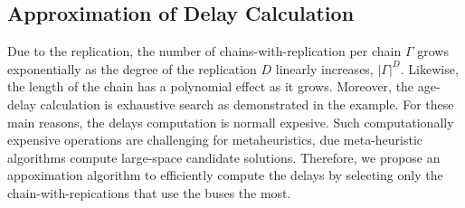 \subsection{Approximation of Delay Calculation}
Due to the replication, the number of chains-with-replication per chain $\Gamma$ grows exponentially as the degree of the replication $D$ linearly increases, $|\Gamma|^D$. Likewise, the length of the chain has a polynomial effect as it grows. Moreover, the age-delay calculation is exhaustive search as demonstrated in the example. For these main reasons, the delays computation is normall expesive. Such computationally expensive operations are challenging for metaheuristics, due meta-heuristic algorithms compute large-space candidate solutions. Therefore, we propose an appoximation algorithm to efficiently compute the delays by selecting only the chain-with-repications that use the buses the most.






